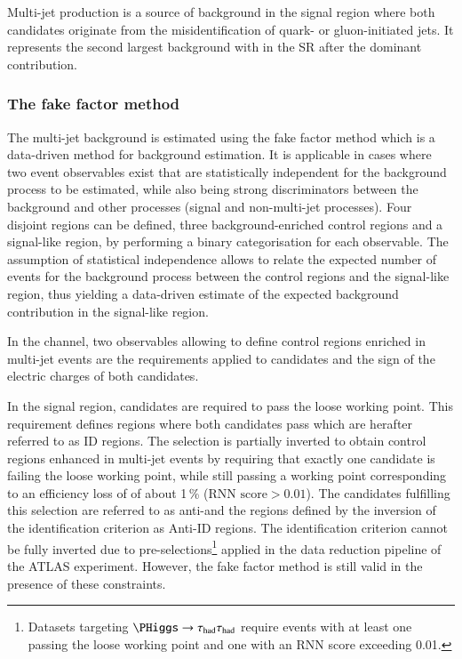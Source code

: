 \label{sec:hadhad_multijet}

Multi-jet production is a source of background in the \hadhad signal
region where both \tauhadvis candidates originate from the
misidentification of quark- or gluon-initiated jets. It represents the
second largest background with \faketauhadvis in the \hadhad SR after
the dominant \ttbarFakes contribution.

\subsubsection{The fake factor method}

The multi-jet background is estimated using the fake factor method
which is a data-driven method for background estimation. It is
applicable in cases where two event observables exist that are
statistically independent for the background process to be estimated,
while also being strong discriminators between the background and
other processes (signal and non-multi-jet processes). Four disjoint
regions can be defined, three background-enriched control regions and
a signal-like region, by performing a binary categorisation for each
observable. The assumption of statistical independence allows to
relate the expected number of events for the background process
between the control regions and the signal-like region, thus yielding
a data-driven estimate of the expected background contribution in the
signal-like region.

In the \hadhad channel, two observables allowing to define control
regions enriched in multi-jet events are the \tauid requirements
applied to \tauhadvis candidates and the sign of the electric charges
of both candidates.

In the signal region, \tauhadvis candidates are required to pass the
loose \tauid working point. This requirement defines regions where
both \tauhadvis candidates pass \tauid which are herafter referred to
as ID regions. The selection is partially inverted to obtain control
regions enhanced in multi-jet events by requiring that exactly one
\tauhadvis candidate is failing the loose \tauid working point, while
still passing a working point corresponding to an efficiency loss of
\tauhad of about 1\,\% ($\text{RNN score} > 0.01$). The \tauhadvis
candidates fulfilling this selection are referred to as
anti-\tauhadvis and the regions defined by the inversion of the
identification criterion as Anti-ID regions. The identification
criterion cannot be fully inverted due to
pre-selections\footnote{Datasets targeting $\PHiggs \to \hadhad$
  require events with at least one \tauhadvis passing the loose \tauid
  working point and one \tauhadvis with an RNN \tauid score exceeding
  0.01.} applied in the data reduction pipeline of the ATLAS
experiment. However, the fake factor method is still valid in the
presence of these constraints.

